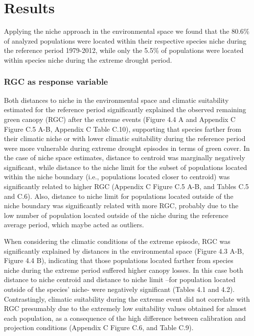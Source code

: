 \documentclass[11pt,twoside]{reedthesis}
\begin{document}
\section{Results}\label{results-2}

Applying the niche approach in the environmental space we found that the
80.6\% of analyzed populations were located within their respective
species niche during the reference period 1979-2012, while only the
5.5\% of populations were located within species niche during the
extreme drought period.

\subsubsection{RGC as response variable}\label{rgc-as-response-variable}

Both distances to niche in the environmental space and climatic
suitability estimated for the reference period significantly explained
the observed remaining green canopy (RGC) after the extreme events
(Figure 4.4 A and Appendix C Figure C.5 A-B, Appendix C Table C.10),
supporting that species farther from their climatic niche or with lower
climatic suitability during the reference period were more vulnerable
during extreme drought episodes in terms of green cover. In the case of
niche space estimates, distance to centroid was marginally negatively
significant, while distance to the niche limit for the subset of
populations located within the niche boundary (i.e., populations located
closer to centroid) was significantly related to higher RGC (Appendix C
Figure C.5 A-B, and Tables C.5 and C.6). Also, distance to niche limit
for populations located outside of the niche boundary was significantly
related with more RGC, probably due to the low number of population
located outside of the niche during the reference average period, which
maybe acted as outliers.\par

When considering the climatic conditions of the extreme episode, RGC was
significantly explained by distances in the environmental space (Figure
4.3 A-B, Figure 4.4 B), indicating that those populations located
farther from species niche during the extreme period suffered higher
canopy losses. In this case both distance to niche centroid and distance
to niche limit --for population located outside of the species' niche-
were negatively significant (Tables 4.1 and 4.2). Contrastingly,
climatic suitability during the extreme event did not correlate with RGC
presumably due to the extremely low suitability values obtained for
almost each population, as a consequence of the high difference between
calibration and projection conditions (Appendix C Figure C.6, and Table
C.9).
\end{document}
